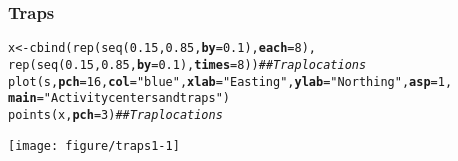\documentclass[color=usenames,dvipsnames]{beamer}\usepackage[]{graphicx}\usepackage[]{xcolor}
\makeatletter
\newcommand{\hlnum}[1]{\textcolor[rgb]{0.69,0.494,0}{#1}}%
\newcommand{\hlsng}[1]{\textcolor[rgb]{0.749,0.012,0.012}{#1}}%
\newcommand{\hlcom}[1]{\textcolor[rgb]{0.514,0.506,0.514}{\textit{#1}}}%
\newcommand{\hldef}[1]{\textcolor[rgb]{0,0,0}{#1}}%
\newcommand{\hlkwb}[1]{\textcolor[rgb]{0,0.341,0.682}{#1}}%
\newcommand{\hlkwc}[1]{\textcolor[rgb]{0,0,0}{\textbf{#1}}}%
\newcommand{\hlkwd}[1]{\textcolor[rgb]{0.004,0.004,0.506}{#1}}%
\newenvironment{kframe}{%
 \def\at@end@of@kframe{}%
 \ifinner\ifhmode%
  \def\at@end@of@kframe{\end{minipage}}%
  \begin{minipage}{\columnwidth}%
 \fi\fi%
 \def\FrameCommand##1{\hskip\@totalleftmargin \hskip-\fboxsep
 \colorbox{shadecolor}{##1}\hskip-\fboxsep
     \hskip-\linewidth \hskip-\@totalleftmargin \hskip\columnwidth}%
 \MakeFramed {\advance\hsize-\width
   \@totalleftmargin\z@ \linewidth\hsize
   \@setminipage}}%
 {\par\unskip\endMakeFramed%
 \at@end@of@kframe}
\newenvironment{knitrout}{}{} %
\makeatother
\begin{document}
\begin{frame}[fragile]
  \frametitle{Traps}
\begin{knitrout}\scriptsize
{}\color{fgcolor}\begin{kframe}
\begin{alltt}
\hldef{x} \hlkwb{<-} \hlkwd{cbind}\hldef{(}\hlkwd{rep}\hldef{(}\hlkwd{seq}\hldef{(}\hlnum{0.15}\hldef{,} \hlnum{0.85}\hldef{,} \hlkwc{by}\hldef{=}\hlnum{0.1}\hldef{),} \hlkwc{each}\hldef{=}\hlnum{8}\hldef{),}
           \hlkwd{rep}\hldef{(}\hlkwd{seq}\hldef{(}\hlnum{0.15}\hldef{,} \hlnum{0.85}\hldef{,} \hlkwc{by}\hldef{=}\hlnum{0.1}\hldef{),} \hlkwc{times}\hldef{=}\hlnum{8}\hldef{))}  \hlcom{## Trap locations}
\hlkwd{plot}\hldef{(s,} \hlkwc{pch}\hldef{=}\hlnum{16}\hldef{,} \hlkwc{col}\hldef{=}\hlsng{"blue"}\hldef{,} \hlkwc{xlab}\hldef{=}\hlsng{"Easting"}\hldef{,} \hlkwc{ylab}\hldef{=}\hlsng{"Northing"}\hldef{,} \hlkwc{asp}\hldef{=}\hlnum{1}\hldef{,}
     \hlkwc{main}\hldef{=}\hlsng{"Activity centers and traps"}\hldef{)}
\hlkwd{points}\hldef{(x,} \hlkwc{pch}\hldef{=}\hlnum{3}\hldef{)}              \hlcom{## Trap locations}
\end{alltt}
\end{kframe}

{\centering \texttt{[image: figure/traps1-1]} 

}


\end{knitrout}
\end{frame}
\end{document}
